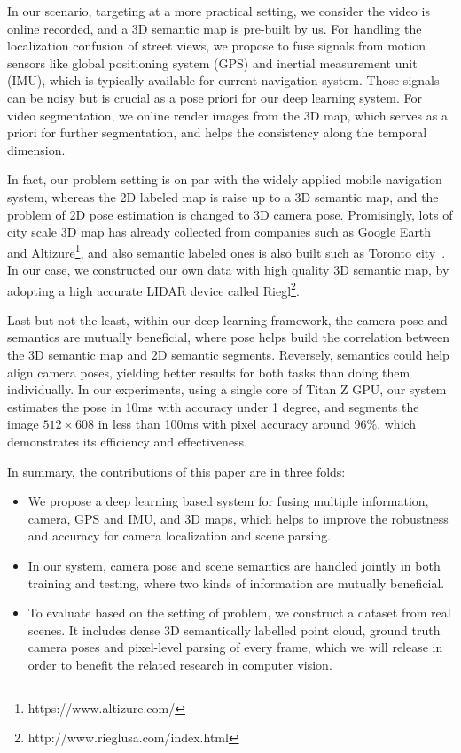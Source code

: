In our scenario, targeting at a more practical setting, we consider the video is online recorded, and a 3D semantic map is pre-built by us. For handling the localization confusion of street views, we propose to fuse signals from motion sensors like global positioning system (GPS) and inertial measurement unit (IMU), which is typically available for current navigation system. Those signals can be noisy but is crucial as a pose priori for our deep learning system.
For video segmentation, we online render images from the 3D map, which serves as a priori for further segmentation, and helps the consistency along the temporal dimension.

%
In fact, our problem setting is on par with the widely applied mobile navigation system, whereas the 2D labeled map is raise up to a 3D semantic map, and the problem of 2D pose estimation is changed to 3D camera pose. Promisingly, lots of city scale 3D map has already collected from companies such as Google Earth~\cite{sheppard2009ethics} and Altizure\footnote{https://www.altizure.com/}, and also semantic labeled ones is also built such as Toronto city~\cite{wang2016torontocity}. In our case, we constructed our own data with high quality 3D semantic map, by adopting a high accurate LIDAR device called Riegl\footnote{http://www.rieglusa.com/index.html}.

Last but not the least, within our deep learning framework, the camera pose and semantics are mutually beneficial, where pose helps build the correlation between the 3D semantic map and 2D semantic segments. Reversely, semantics could help align camera poses, yielding better results for both tasks than doing them individually. In our experiments, using a single core of Titan Z GPU, our system estimates the pose in 10ms with accuracy under 1 degree, and segments the image $512 \times 608$ in less than 100ms with pixel accuracy around 96$\%$, which demonstrates its efficiency and effectiveness.

In summary, the contributions of this paper are in three folds:
\begin{itemize}
    \item We propose a deep learning based system for fusing multiple information, \ie camera, GPS and IMU, and 3D maps, which helps to improve the robustness and accuracy for camera localization and scene parsing.
    \item In our system, camera pose and scene semantics are handled jointly in both training and testing, where two kinds of information are mutually beneficial.
    \item To evaluate based on the setting of problem, we construct a dataset from real scenes. It includes dense 3D semantically labelled point cloud, ground truth camera poses and pixel-level parsing of every frame, which we will release in order to benefit the related research in computer vision.
\end{itemize}

